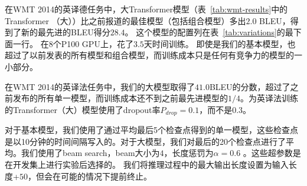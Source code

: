
在WMT 2014的英译德任务中，大Transformer模型（表~\ref{tab:wmt-results}中的Transformer （大））比之前报道的最佳模型（包括组合模型）多出$2.0$ BLEU，得到了新的最先进的BLEU得分$28.4$。 这个模型的配置列在表~\ref{tab:variations}的最下面一行。 在$8$个P100 GPU上，花了$3.5$天时间训练。 即使是我们的基本模型，也超过了以前发表的所有模型和组合模型，而训练成本只是任何有竞争力的模型的一小部分。


在WMT 2014的英译法任务中，我们的大模型取得了$41.0$BLEU的分数，超过了之前发布的所有单一模型，而训练成本还不到之前最先进模型的$1/4$。为英译法训练的Transformer（大）模型使用了dropout率$P_{drop}=0.1$，而不是$0.3$。


对于基本模型，我们使用了通过平均最后5个检查点得到的单一模型，这些检查点是以10分钟的时间间隔写入的。对于大模型，我们对最后的20个检查点进行了平均。我们使用了beam search，beam大小为$4$，长度惩罚为$\alpha=0.6$ \citep{wu2016google}。这些超参数是在开发集上进行实验后选择的。 我们将推理过程中的最大输出长度设置为输入长度+$50$，但会在可能的情况下提前终止\citep{wu2016google}。

